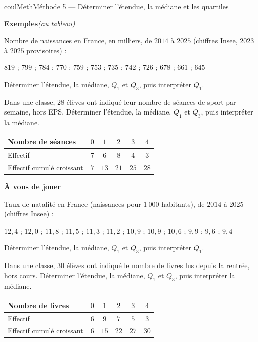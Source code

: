 \documentclass[11pt,a4paper]{article}
\makeatletter
\newcounter{lycee@signet}
\newcommand{\signet}[3][]{\stepcounter{lycee@signet}%
  \edef\lycee@dest{\if\relax\detokenize{#1}\relax
    signet.\arabic{lycee@signet}\else#1\fi}%
  \hypertarget{\lycee@dest}{}\bookmark[level=#2,dest=\lycee@dest]{#3}}
\newcounter{methode}
\newenvironment{methodebox}[1][Méthode]{\stepcounter{methode}%
  \begin{boitecours}[phantom={\signet[methode-\arabic{methode}]{2}{#1}}]{coulMeth}{#1}}%
  {\end{boitecours}}
\newcommand{\etape}[1]{\par\smallskip\textbf{\color{coulMeth}#1}\par\nobreak\smallskip}
\newcommand{\autableau}{\hfill{\footnotesize\itshape\color{black!45}(au tableau)}}
\newcommand{\etapeexemples}{%
    \par\smallskip\textbf{\color{coulMeth}Exemples}\autableau\par\nobreak\smallskip}
\makeatother
\begin{document}
\begin{methodebox}[Méthode 5 --- Déterminer l'étendue, la médiane et les quartiles]
\etapeexemples
\begin{questions}[label=\alph*)]
  \item Nombre de naissances en France, en milliers, de $2014$ à $2025$ (chiffres
    Insee, $2023$ à $2025$ provisoires) :
    \begin{center}
    $819$ ; $799$ ; $784$ ; $770$ ; $759$ ; $753$ ; $735$ ; $742$ ; $726$ ; $678$ ;
    $661$ ; $645$
    \end{center}
    Déterminer l'étendue, la médiane, $Q_1$ et $Q_3$, puis interpréter $Q_1$.
  \item Dans une classe, $28$ élèves ont indiqué leur nombre de séances de sport par
    semaine, hors EPS. Déterminer l'étendue, la médiane, $Q_1$ et $Q_3$, puis
    interpréter la médiane.
    \begin{center}
    \renewcommand{\arraystretch}{1.5}
    \begin{tabular}{|l|*{5}{c|}}
    \hline
    Nombre de séances & $0$ & $1$ & $2$ & $3$ & $4$\\\hline
    Effectif & $7$ & $6$ & $8$ & $4$ & $3$\\\hline
    Effectif cumulé croissant & $7$ & $13$ & $21$ & $25$ & $28$\\\hline
    \end{tabular}
    \end{center}
\end{questions}

\etape{À vous de jouer}
\begin{questions}[label=\alph*)]
  \item Taux de natalité en France (naissances pour $1~000$ habitants), de $2014$ à
    $2025$ (chiffres Insee) :
    \begin{center}
    $12{,}4$ ; $12{,}0$ ; $11{,}8$ ; $11{,}5$ ; $11{,}3$ ; $11{,}2$ ; $10{,}9$ ;
    $10{,}9$ ; $10{,}6$ ; $9{,}9$ ; $9{,}6$ ; $9{,}4$
    \end{center}
    Déterminer l'étendue, la médiane, $Q_1$ et $Q_3$, puis interpréter $Q_1$.
  \item Dans une classe, $30$ élèves ont indiqué le nombre de livres lus depuis la
    rentrée, hors cours. Déterminer l'étendue, la médiane, $Q_1$ et $Q_3$, puis
    interpréter la médiane.
    \begin{center}
    \renewcommand{\arraystretch}{1.5}
    \begin{tabular}{|l|*{5}{c|}}
    \hline
    Nombre de livres & $0$ & $1$ & $2$ & $3$ & $4$\\\hline
    Effectif & $6$ & $9$ & $7$ & $5$ & $3$\\\hline
    Effectif cumulé croissant & $6$ & $15$ & $22$ & $27$ & $30$\\\hline
    \end{tabular}
    \end{center}
\end{questions}

\end{methodebox}
\end{document}
